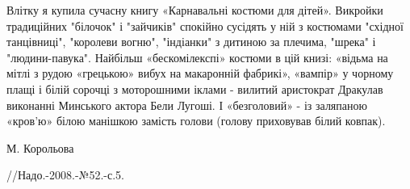 Влітку я купила сучасну книгу «Карнавальні костюми для дітей». Викройки
традиційних "білочок" і "зайчиків" спокійно сусідять у ній з костюмами "східної
танцівниці", "королеви вогню", "індіанки" з дитиною за плечима, "шрека" і
"людини-павука". Найбільш «бескомілекспі» костюми в цій книзі: «відьма на мітлі
з рудою «грецькою» вибух на макаронній фабрикі», «вампір» у чорному плащі і
білій сорочці з моторошними іклами - вилитий аристократ Дракулав виконанні
Минського актора Бели Лугоші. І «безголовий» - із заляпаною «кров'ю» білою
манішкою замість голови (голову приховував білий ковпак).

М. Корольова

//Надо.-2008.-№52.-с.5.


